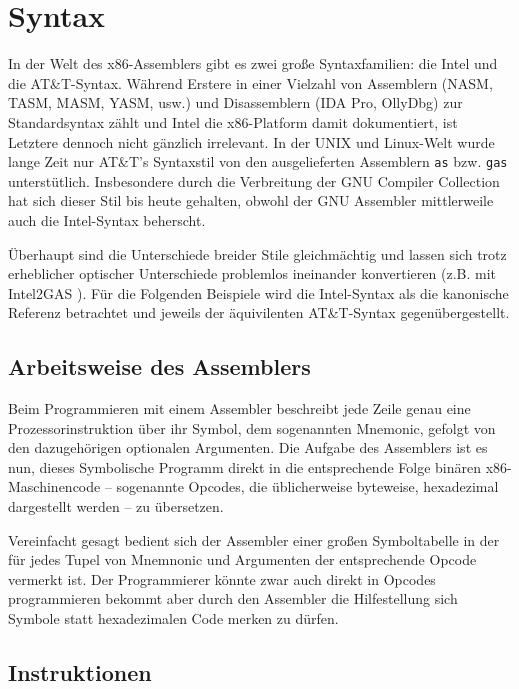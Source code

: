 \section{Syntax}

In der Welt des x86-Assemblers gibt es zwei große Syntaxfamilien: die Intel und
die AT\&T-Syntax. Während Erstere in einer Vielzahl von Assemblern (NASM, TASM,
MASM, YASM, usw.) und Disassemblern (IDA Pro, OllyDbg) zur Standardsyntax zählt
und Intel die x86-Platform damit dokumentiert, ist Letztere dennoch nicht
gänzlich irrelevant. In der UNIX und Linux-Welt wurde lange Zeit nur AT\&T's
Syntaxstil von den ausgelieferten Assemblern \texttt{as} bzw. \texttt{gas}
unterstütlich. Insbesondere durch die Verbreitung der GNU Compiler Collection
hat sich dieser Stil bis heute gehalten, obwohl der GNU Assembler mittlerweile
auch die Intel-Syntax beherscht.

Überhaupt sind die Unterschiede breider Stile gleichmächtig und lassen sich
trotz erheblicher optischer Unterschiede problemlos ineinander konvertieren
(z.B. mit Intel2GAS \cite{i2g}). Für die Folgenden Beispiele wird die
Intel-Syntax als die kanonische Referenz betrachtet und jeweils der
äquivilenten AT\&T-Syntax gegenübergestellt.


\subsection{Arbeitsweise des Assemblers}

Beim Programmieren mit einem Assembler beschreibt jede Zeile genau eine
Prozessorinstruktion über ihr Symbol, dem sogenannten Mnemonic, gefolgt von
den dazugehörigen optionalen Argumenten. Die Aufgabe des Assemblers ist es nun,
dieses Symbolische Programm direkt in die entsprechende Folge binären
x86-Maschinencode – sogenannte Opcodes, die üblicherweise byteweise,
hexadezimal dargestellt werden – zu übersetzen.

Vereinfacht gesagt bedient sich der Assembler einer großen Symboltabelle in der
für jedes Tupel von Mnemnonic und Argumenten der entsprechende Opcode vermerkt
ist. Der Programmierer könnte zwar auch direkt in Opcodes programmieren bekommt
aber durch den Assembler die Hilfestellung sich Symbole statt hexadezimalen Code
merken zu dürfen.

\subsection{Instruktionen}

